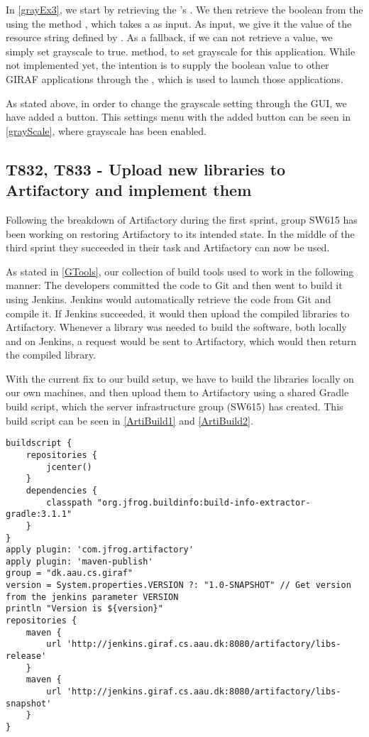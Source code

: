 In \autoref{grayEx3}, we start by retrieving the \lapp's
.
We then retrieve the boolean from the  using the method
, which takes a  as input. As input, we give it the
value of the resource string defined by
. As a fallback, if we can not
retrieve a value, we simply set grayscale to true.
 method, to set grayscale for this
application. While not implemented yet, the intention is to supply the boolean
value to other GIRAF applications through the , which is used to
launch those applications.\nl

As stated above, in order to change the grayscale setting through the GUI, we
have added a  button. This settings menu with the added button can
be seen in \autoref{grayScale}, where grayscale has been enabled.  

\subsection{T832, T833 - Upload new libraries to Artifactory and implement them}

Following the breakdown of Artifactory during the first sprint, group SW615 has
been working on restoring Artifactory to its intended state. In the middle of
the third sprint they succeeded in their task and Artifactory can now be
used.\nl

As stated in \autoref{GTools}, our collection of build tools used to work in the
following manner:
The developers committed the code to Git and then went to build it using
Jenkins. Jenkins would automatically retrieve the code from Git and compile it.
If Jenkins succeeded, it would then upload the compiled libraries to
Artifactory. Whenever a library was needed to build the software, both locally
and on Jenkins, a request would be sent to Artifactory, which would then return
the compiled library.\nl

With the current fix to our build setup, we have to build the libraries locally
on our own machines, and then upload them to Artifactory using a shared Gradle
build script, which the server infrastructure group (SW615) has created. This
build script can be seen in \autoref{ArtiBuild1} and \autoref{ArtiBuild2}. \nl

\begin{minipage}[H]{\linewidth}
\begin{lstlisting}[caption = Start of the shared build script, label = ArtiBuild1] 
buildscript {
    repositories {
        jcenter()
    }
    dependencies {
        classpath "org.jfrog.buildinfo:build-info-extractor-gradle:3.1.1"
    }
}
apply plugin: 'com.jfrog.artifactory'
apply plugin: 'maven-publish'
group = "dk.aau.cs.giraf"
version = System.properties.VERSION ?: "1.0-SNAPSHOT" // Get version from the jenkins parameter VERSION
println "Version is ${version}"
repositories {
    maven {
        url 'http://jenkins.giraf.cs.aau.dk:8080/artifactory/libs-release'
    }
    maven {
        url 'http://jenkins.giraf.cs.aau.dk:8080/artifactory/libs-snapshot'
    }
}
\end{lstlisting}
\end{minipage}

